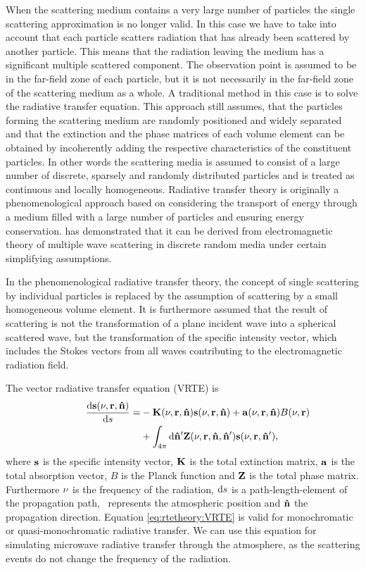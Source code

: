 When the scattering medium contains a very large number of particles
the single scattering approximation is no longer valid. In this case
we have to take into account that each particle scatters radiation
that has already been scattered by another particle. This means that
the radiation leaving the medium has a significant multiple scattered
component. The observation point is assumed to be in the far-field
zone of each particle, but it is not necessarily in the far-field zone
of the scattering medium as a whole. A traditional method in this case
is to solve the radiative transfer equation.  This approach still
assumes, that the particles forming the scattering medium are randomly
positioned and widely separated and that the extinction and the phase
matrices of each volume element can be obtained by incoherently adding
the respective characteristics of the constituent particles. In other
words the scattering media is assumed to consist of a large number of
discrete, sparsely and randomly distributed particles and is treated
as continuous and locally homogeneous.  Radiative transfer theory is
originally a phenomenological approach based on considering the
transport of energy through a medium filled with a large number of
particles and ensuring energy conservation.
\citet{mishchenko02:_vector} has demonstrated that it can be derived
from electromagnetic theory of multiple wave scattering in discrete
random media under certain simplifying assumptions.

In the phenomenological radiative transfer theory, the concept of
single scattering by individual particles is replaced by the
assumption of scattering by a small homogeneous volume element. It is
furthermore assumed that the result of scattering is not the
transformation of a plane incident wave into a spherical scattered
wave, but the transformation of the specific intensity vector, which
includes the Stokes vectors from all waves contributing to the
electromagnetic radiation field.

The vector radiative transfer equation (VRTE) is
 \begin{eqnarray}
  \label{eq:rtetheory:VRTE}
  \frac {\DiffD\StoVec(\Frq,\PPos,\PDir)}{\DiffD s} =
    &{}-\ExtMat(\Frq,\PPos,\PDir) \StoVec(\Frq,\PPos,\PDir) +
    \AbsVec(\Frq,\PPos,\PDir) \rlap{$B(\Frq,\PPos)$} \\ \nonumber
    &{}+ \int_{4\pi} \DiffD\PDir' \PhaMat(\Frq,\PPos,\PDir,\PDir')
    \StoVec(\Frq,\PPos,\PDir'),
\end{eqnarray}
where ${\bf s}$ is the specific intensity vector, ${\bf K}$ is the total
extinction matrix, ${\bf a}$ is the total absorption vector, $B$ is the Planck
function and ${\bf Z}$ is the total phase matrix. Furthermore $\nu$ is the
frequency of the radiation, $\mathrm{d} s$ is a
path-length-element of the propagation path, \PPos\ represents the atmospheric
position and ${\bf \hat{n}}$ the propagation direction. Equation
\ref{eq:rtetheory:VRTE} is valid for monochromatic or quasi-monochromatic
radiative transfer. We can use this equation for simulating microwave radiative
transfer through the atmosphere, as the scattering events do not change the
frequency of the radiation.

